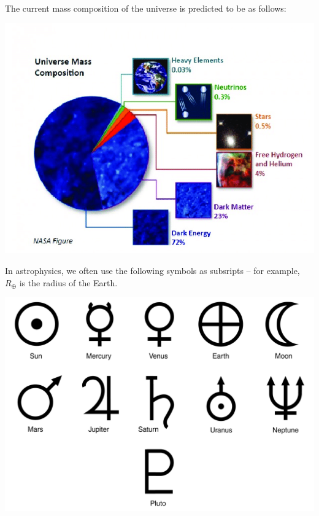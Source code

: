 \documentclass[class=article, crop=false]{standalone}
\begin{document}
\par
The current mass composition of the universe is predicted to be as follows:
\begin{center}
    \includegraphics[width=.5\textwidth]{Universe-mass-composition.png}
\end{center}
In astrophysics, we often use the following symbols as subsripts -- for example, $R_\oplus$ is the radius of the Earth.
\begin{center}
    \includegraphics[width=.5\textwidth]{astrology.jpg}
\end{center}
\end{document}
